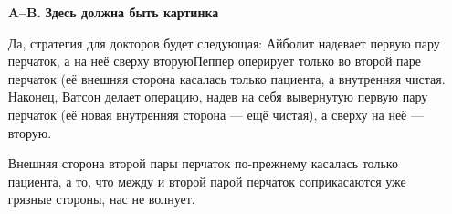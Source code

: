 \begin{itemize}

\item[\bf A–B.] {\bf Здесь должна быть картинка}

\itC Да, стратегия для докторов будет следующая: Айболит надевает первую пару перчаток, а на неё сверху вторую\scolon Пеппер оперирует только во второй паре перчаток (её внешняя сторона касалась только пациента, а внутренняя чистая. Наконец, Ватсон делает операцию, надев на себя вывернутую первую пару перчаток (её новая внутренняя сторона — ещё чистая), а сверху на неё — вторую.

Внешняя сторона второй пары перчаток по-прежнему касалась только пациента, а то, что между и второй парой перчаток соприкасаются уже грязные стороны, нас не волнует.
\end{itemize}